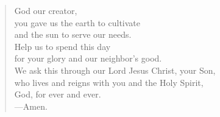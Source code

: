 \prayer

\setlength{\leftmargini}{\prayerleftmargini}

\begin{verse}
God our creator,\\
you gave us the earth to cultivate\\
and the sun to serve our needs.\\
Help us to spend this day\\
for your glory and our neighbor’s good.\\
We ask this through our Lord Jesus Christ, your Son,\\
who lives and reigns with you and the Holy Spirit,\\
God, for ever and ever.\\
{\color{red}---\thinspace}Amen.
\end{verse}

\setlength{\leftmargini}{\defleftmargini}